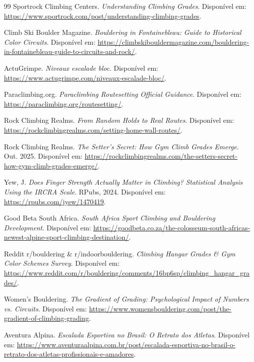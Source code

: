 \begin{thebibliography}{99}
Sportrock Climbing Centers.
\newblock \textit{Understanding Climbing Grades}.
\newblock Disponível em: \url{https://www.sportrock.com/post/understanding-climbing-grades}.

Climb Ski Boulder Magazine.
\newblock \textit{Bouldering in Fontainebleau: Guide to Historical Color Circuits}.
\newblock Disponível em: \url{https://climbskibouldermagazine.com/bouldering-in-fontainebleau-guide-to-circuits-and-rock/}.

ActuGrimpe.
\newblock \textit{Niveaux escalade bloc}.
\newblock Disponível em: \url{https://www.actugrimpe.com/niveaux-escalade-bloc/}.

Paraclimbing.org.
\newblock \textit{Paraclimbing Routesetting Official Guidance}.
\newblock Disponível em: \url{https://paraclimbing.org/routesetting/}.

Rock Climbing Realms.
\newblock \textit{From Random Holds to Real Routes}.
\newblock Disponível em: \url{https://rockclimbingrealms.com/setting-home-wall-routes/}.

Rock Climbing Realms.
\newblock \textit{The Setter's Secret: How Gym Climb Grades Emerge}.
\newblock Out. 2025. Disponível em: \url{https://rockclimbingrealms.com/the-setters-secret-how-gym-climb-grades-emerge/}.

Yew, J.
\newblock \textit{Does Finger Strength Actually Matter in Climbing? Statistical Analysis Using the IRCRA Scale}.
\newblock RPubs, 2024. Disponível em: \url{https://rpubs.com/jyew/1470419}.

Good Beta South Africa.
\newblock \textit{South Africa Sport Climbing and Bouldering Development}.
\newblock Disponível em: \url{https://goodbeta.co.za/the-colosseum-south-africas-newest-alpine-sport-climbing-destination/}.

Reddit r/bouldering \& r/indoorbouldering.
\newblock \textit{Climbing Hangar Grades \& Gym Color Schemes Survey}.
\newblock Disponível em: \url{https://www.reddit.com/r/bouldering/comments/16bp6sp/climbing_hangar_grades/}.

Women's Bouldering.
\newblock \textit{The Gradient of Grading: Psychological Impact of Numbers vs. Circuits}.
\newblock Disponível em: \url{https://www.womensbouldering.com/post/the-gradient-of-climbing-grading}.

Aventura Alpina.
\newblock \textit{Escalada Esportiva no Brasil: O Retrato dos Atletas}.
\newblock Disponível em: \url{https://www.aventuraalpina.com.br/post/escalada-esportiva-no-brasil-o-retrato-dos-atletas-profissionais-e-amadores}.

\end{thebibliography}
